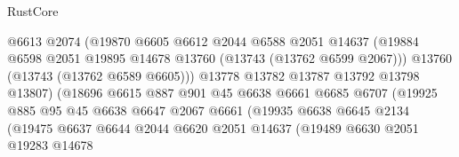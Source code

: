 \begin{lexlean}{RustCore}
\begin{coremodule}
                                    @6613
                                    @2074
                                    (@19870
                                      @6605
                                      @6612
                                      @2044
                                      @6588
                                      @2051
                                      @14637
                                      (@19884
                                        @6598
                                        @2051
                                        @19895
                                        @14678
                                        @13760
                                        (@13743 (@13762 @6599 @2067)))
                                      @13760
                                      (@13743 (@13762 @6589 @6605)))
                                    @13778
                                    @13782
                                    @13787
                                    @13792
                                    @13798
                                    @13807)
                                  (@18696
                                    @6615
                                    @887
                                    @901
                                    @45
                                    @6638
                                    @6661
                                    @6685
                                    @6707
                                    (@19925
                                      @885
                                      @95
                                      @45
                                      @6638
                                      @6647
                                      @2067
                                      @6661
                                      (@19935
                                        @6638
                                        @6645
                                        @2134
                                        (@19475
                                          @6637
                                          @6644
                                          @2044
                                          @6620
                                          @2051
                                          @14637
                                          (@19489
                                            @6630
                                            @2051
                                            @19283
                                            @14678

\end{coremodule}
\end{lexlean}

